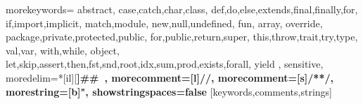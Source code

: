 

%
{morekeywords={
  abstract,%
  case,catch,char,class,%
  def,do,else,extends,final,finally,for,%
  if,import,implicit,%
  match,module,%
  new,null,undefined,%
  fun, array,
  override,%
  package,private,protected,public,%
  for,public,return,super,%
  this,throw,trait,try,type,%
  val,var,%
  with,while,%
  object,
  let,skip,assert,then,fst,snd,root,idx,sum,prod,exists,forall,%
  yield%
  },%
  sensitive,%
  moredelim=*[il][\bfseries]{\#\#\ },
  morecomment=[l]//,%
  morecomment=[s]{/*}{*/},%
  morestring=[b]",%
  showstringspaces=false%
}[keywords,comments,strings]%



\newcommand{\commentstyle}[1]{\color{ccomment}\itshape{#1}}
\newcommand{\keywordstyle}[1]{\color{ckeyword}\bfseries{#1}}
\newcommand{\stringstyle}[1]{\color{cstring}\bfseries{#1}}


\newcommand{\code}[1]{\lstinline[language=Scala,columns=fixed,basicstyle=\ttfamily]|#1|}

